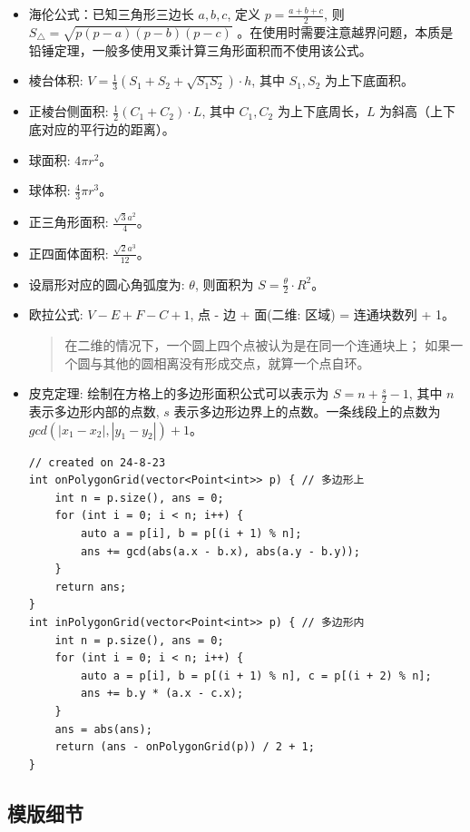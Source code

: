 \documentclass[a4paper,12pt]{article}
\begin{document}
\begin{itemize}
\item 海伦公式：已知三角形三边长 \(a, b, c\), 定义 \(p = \frac{a+b+c}{2}\), 则 \(S_\triangle = \sqrt{p(p-a)(p-b)(p-c)}\)
。在使用时需要注意越界问题，本质是铅锤定理，一般多使用叉乘计算三角形面积而不使用该公式。

\item 棱台体积: \(V = \frac{1}{3}(S_1 + S_2 + \sqrt{S_1 S_2}) \cdot h\), 其中 \(S_1, S_2\) 为上下底面积。
\item 正棱台侧面积: \(\frac{1}{2}(C_1 + C_2) \cdot L\), 其中 \(C_1, C_2\) 为上下底周长，\(L\) 为斜高（上下底对应的平行边的距离）。
\item 球面积: \(4\pi r^2\)。
\item 球体积: \(\frac{4}{3}\pi r^3 \)。
\item 正三角形面积: \(\frac{\sqrt{3}a^2}{4}\)。
\item 正四面体面积: \(\frac{\sqrt{2}a^3}{12}\)。
\item 设扇形对应的圆心角弧度为: \(\theta\), 则面积为 \(S = \frac{\theta}{2} \cdot R^2\)。
\item 欧拉公式: \(V - E + F - C + 1\), 点 - 边 + 面(二维: 区域) = 连通块数列 + 1。
\begin{quote}
    在二维的情况下，一个圆上四个点被认为是在同一个连通块上；
    如果一个圆与其他的圆相离没有形成交点，就算一个点自环。    
\end{quote}
\item 皮克定理: 绘制在方格上的多边形面积公式可以表示为 \(S = n + \frac{s}{2} - 1\), 
其中 \(n\) 表示多边形内部的点数, \(s\) 表示多边形边界上的点数。一条线段上的点数为 \(gcd(|x_1 - x_2|, |y_1 - y_2|) + 1\)。
\begin{lstlisting}
// created on 24-8-23
int onPolygonGrid(vector<Point<int>> p) { // 多边形上
    int n = p.size(), ans = 0;
    for (int i = 0; i < n; i++) {
        auto a = p[i], b = p[(i + 1) % n];
        ans += gcd(abs(a.x - b.x), abs(a.y - b.y));
    }
    return ans;
}
int inPolygonGrid(vector<Point<int>> p) { // 多边形内
    int n = p.size(), ans = 0;
    for (int i = 0; i < n; i++) {
        auto a = p[i], b = p[(i + 1) % n], c = p[(i + 2) % n];
        ans += b.y * (a.x - c.x);
    }
    ans = abs(ans);
    return (ans - onPolygonGrid(p)) / 2 + 1;
} 
\end{lstlisting}
\end{itemize}

\subsection{模版细节}
\end{document}
